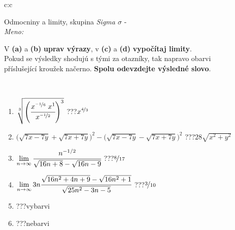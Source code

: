 \documentclass[10pt]{report}
\begin{document}
\newpage
\thispagestyle{empty}
\begin{tabular}{c:c}
\begin{minipage}[c][104.5mm][t]{0.5\linewidth}
\begin{center}
\vspace{7mm}
{\huge Odmocniny a limity, skupina \textit{Sigma $\sigma$} -}\\[5mm]
\textit{Meno:}\phantom{xxxxxxxxxxxxxxxxxxxxxxxxxxxxxxxxxxxxxxxxxxxxxxxxxxxxxxxxxxxxxxxxx}\\[5mm]
\begin{minipage}{0.95\linewidth}
\begin{center}
V \textbf{(a)} a \textbf{(b)} \textbf{uprav výrazy}, v \textbf{(c)} a \textbf{(d)} \textbf{vypočítaj limity}.\\Pokud se výsledky shodujú s tými za otazníky, tak napravo obarvi\\příslušející kroužek načerno. \textbf{Spolu odevzdejte výsledné slovo}.
\end{center}
\end{minipage}
\\[1mm]
\begin{minipage}{0.79\linewidth}
\begin{center}
\begin{varwidth}{\linewidth}
\begin{enumerate}
\small
\item $\sqrt[3]{\left(\cfrac{x^{\nicefrac{-1}{6}}\;x^{1}}{x^{\nicefrac{-1}{2}}}\right)^{3}}$\quad \dotfill\; ???\;\dotfill \quad $x^{\nicefrac{4}{3}}$
\item {\footnotesize{\scriptsize$\big(\sqrt{7x-7y}+\sqrt{7x+7y}\big)^2-\big(\sqrt{7x-7y}-\sqrt{7x+7y}\big)^2$}\quad \dotfill\; ???\;\dotfill \quad $28\sqrt{x^2+y^2}$}
\item $\lim\limits_{n\to\infty}\cfrac{n^{-1/2}}{\sqrt{16n+8}-\sqrt{16n-9}}$\quad \dotfill\; ???\;\dotfill \quad $\nicefrac{8}{17}$
\item $\lim\limits_{n\to\infty}3n\cfrac{\sqrt{16n^2+4n+9}-\sqrt{16n^2+1}}{\sqrt{25n^2-3n-5}}$\quad \dotfill\; ???\;\dotfill \quad $\nicefrac{3}{10}$
\item \quad \dotfill\; ???\;\dotfill \quad vybarvi
\item \quad \dotfill\; ???\;\dotfill \quad nebarvi
\end{enumerate}
\end{varwidth}
\end{center}
\end{minipage}
\begin{minipage}{0.20\linewidth}

\end{minipage}
\end{center}
\end{minipage}
\end{tabular}
\end{document}
